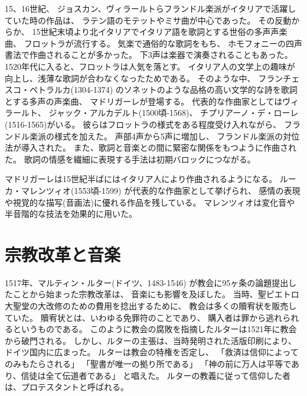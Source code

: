 \documentclass[a4j]{jarticle}
\begin{document}
15、16世紀、
ジョスカン、ヴィラールトらフランドル楽派がイタリアで活躍していた時の作品は、
ラテン語のモテットやミサ曲が中心であった。
その反動からか、
15世紀末頃より北イタリアでイタリア語を歌詞とする世俗の多声声楽曲、
フロットラが流行する。
気楽で通俗的な歌詞をもち、
ホモフォニーの四声書法で作曲されることが多かった。
下3声は楽器で演奏されることもあった。
1520年代に入ると、フロットラは人気を落とす。
イタリア人の文学上の趣味が向上し、浅薄な歌詞が合わなくなったためである。
そのような中、
フランチェスコ・ペトラルカ(1304-1374)
のソネットのような品格の高い文学的な詩を歌詞とする多声の声楽曲、
マドリガーレが登場する。
代表的な作曲家としてはヴィラールト、
ジャック・アルカデルト(1500頃-1568)、
チプリアーノ・デ・ローレ(1516-1565)がいる。
彼らはフロットラの様式をある程度受け入れながら、
フランドル楽派の様式を加えた。
声部4声から5声に増加し、
フランドル楽派の対位法が導入された。
また、歌詞と音楽との間に緊密な関係をもつように作曲された。
歌詞の情感を繊細に表現する手法は初期バロックにつながる。

マドリガーレは15世紀半ばにはイタリア人により作曲されるようになる。
ルーカ・マレンツィオ(1553頃-1599)
が代表的な作曲家として挙げられ、
感情の表現や視覚的な描写(音画法)に優れる作品を残している。
マレンツィオは変化音や半音階的な技法を効果的に用いた。


\section{宗教改革と音楽\label{sec:rel}}

1517年、マルティン・ルター(ドイツ、1483-1546)
が教会に95ヶ条の論題提出したことから始まった宗教改革は、
音楽にも影響を及ぼした。
当時、聖ピエトロ大聖堂の大改修のための費用を捻出するために、
教会は多くの贖宥状を販売していた。
贖宥状とは、いわゆる免罪符のことであり、
購入者は罪から逃れられるというものである。
このように教会の腐敗を指摘したルターは1521年に教会から破門される。
しかし、ルターの主張は、当時発明された活版印刷により、
ドイツ国内に広まった。
ルターは教会の特権を否定し、
「救済は信仰によってのみもたらされる」
「聖書が唯一の拠り所である」
「神の前に万人は平等であり、信徒は全て伝道者である」
と唱えた。
ルターの教義に従って信仰した者は、プロテスタントと呼ばれる。
\end{document}
